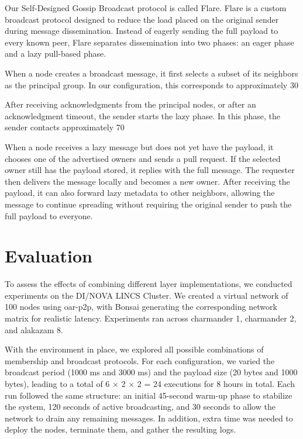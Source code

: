 \documentclass[sigconf,a4paper]{acmart}
\begin{document}
Our Self-Designed Gossip Broadcast protocol is called Flare. Flare is a custom broadcast protocol designed to reduce the load placed on the original sender during message dissemination. Instead of eagerly sending the full payload to every known peer, Flare separates dissemination into two phases: an eager phase and a lazy pull-based phase.

When a node creates a broadcast message, it first selects a subset of its neighbors as the principal group. In our configuration, this corresponds to approximately 30%

After receiving acknowledgments from the principal nodes, or after an acknowledgment timeout, the sender starts the lazy phase. In this phase, the sender contacts approximately 70%

When a node receives a lazy message but does not yet have the payload, it chooses one of the advertised owners and sends a pull request. If the selected owner still has the payload stored, it replies with the full message. The requester then delivers the message locally and becomes a new owner. After receiving the payload, it can also forward lazy metadata to other neighbors, allowing the message to continue spreading without requiring the original sender to push the full payload to everyone.



\section{Evaluation}

To assess the effects of combining different layer implementations, we conducted experiments on the DI/NOVA LINCS Cluster. 
We created a virtual network of 100 nodes using oar-p2p, with Bonsai generating the 
corresponding network matrix for realistic latency. Experiments ran across charmander 1, 
charmander 2, and alakazam 8.

With the environment in place, we explored all possible combinations of membership and 
broadcast protocols. For each configuration, we varied the broadcast period (1000 ms and 3000 ms) 
and the payload size (20 bytes and 1000 bytes), leading to a total of 6 × 2 × 2 = 24 executions for 8 hours in total. 
Each run followed the same structure: an initial 45-second warm-up phase to stabilize the 
system, 120 seconds of active broadcasting, and 30 seconds to allow the network to drain 
any remaining messages. In addition, extra time was needed to deploy the nodes, terminate 
them, and gather the resulting logs.
\end{document}
